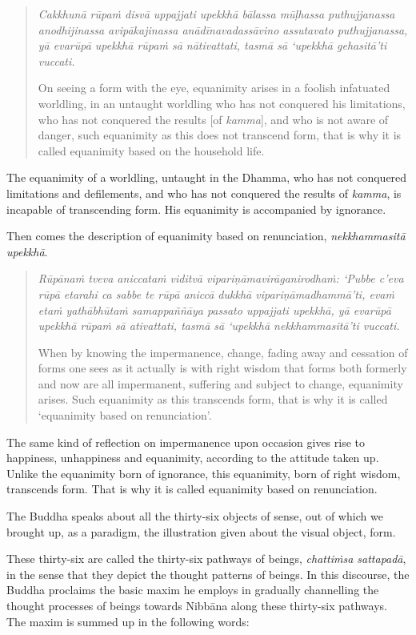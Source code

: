 \begin{quote}
\emph{Cakkhunā rūpaṁ disvā uppajjati upekkhā bālassa mūḷhassa puthujjanassa anodhijinassa avipākajinassa anādīnavadassāvino assutavato puthujjanassa, yā evarūpā upekkhā rūpaṁ sā nātivattati, tasmā sā `upekkhā gehasitā'ti vuccati.}

On seeing a form with the eye, equanimity arises in a foolish infatuated worldling, in an untaught worldling who has not conquered his limitations, who has not conquered the results {[}of \emph{kamma}{]}, and who is not aware of danger, such equanimity as this does not transcend form, that is why it is called equanimity based on the household life.
\end{quote}

The equanimity of a worldling, untaught in the Dhamma, who has not conquered limitations and defilements, and who has not conquered the results of \emph{kamma}, is incapable of transcending form. His equanimity is accompanied by ignorance.

Then comes the description of equanimity based on renunciation, \emph{nekkhammasitā upekkhā}.

\begin{quote}
\emph{Rūpānaṁ tveva aniccataṁ viditvā vipariṇāmavirāganirodhaṁ: `Pubbe c'eva rūpā etarahi ca sabbe te rūpā aniccā dukkhā vipariṇāmadhammā'ti, evaṁ etaṁ yathābhūtaṁ samappaññāya passato uppajjati upekkhā, yā evarūpā upekkhā rūpaṁ sā ativattati, tasmā sā `upekkhā nekkhammasitā'ti vuccati.}

When by knowing the impermanence, change, fading away and cessation of forms one sees as it actually is with right wisdom that forms both formerly and now are all impermanent, suffering and subject to change, equanimity arises. Such equanimity as this transcends form, that is why it is called `equanimity based on renunciation'.
\end{quote}

The same kind of reflection on impermanence upon occasion gives rise to happiness, unhappiness and equanimity, according to the attitude taken up. Unlike the equanimity born of ignorance, this equanimity, born of right wisdom, transcends form. That is why it is called equanimity based on renunciation.

The Buddha speaks about all the thirty-six objects of sense, out of which we brought up, as a paradigm, the illustration given about the visual object, form.

These thirty-six are called the thirty-six pathways of beings, \emph{chattiṁsa sattapadā}, in the sense that they depict the thought patterns of beings. In this discourse, the Buddha proclaims the basic maxim he employs in gradually channelling the thought processes of beings towards Nibbāna along these thirty-six pathways. The maxim is summed up in the following words:


